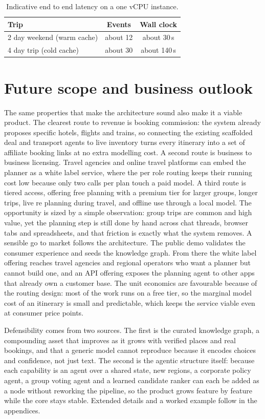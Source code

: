\documentclass{ecai}
\begin{document}
\begin{table}[h]
\caption{Indicative end to end latency on a one vCPU instance.}
\label{tab:lat}
\centering
\begin{tabular}{lcc}
\toprule
Trip & Events & Wall clock \\
\midrule
2 day weekend (warm cache) & about 12 & about 30\,s \\
4 day trip (cold cache) & about 30 & about 140\,s \\
\bottomrule
\end{tabular}
\end{table}

\section{Future scope and business outlook}
\label{sec:future}

The same properties that make the architecture sound also make it a viable
product. The clearest route to revenue is booking commission: the system
already proposes specific hotels, flights and trains, so connecting the
existing scaffolded deal and transport agents to live inventory turns every
itinerary into a set of affiliate booking links at no extra modelling cost. A
second route is business to business licensing. Travel agencies and online
travel platforms can embed the planner as a white label service, where the
per role routing keeps their running cost low because only two calls per plan
touch a paid model. A third route is tiered access, offering free planning with
a premium tier for larger groups, longer trips, live re planning during travel,
and offline use through a local model. The opportunity is sized by a simple observation: group trips are common and
high value, yet the planning step is still done by hand across chat threads,
browser tabs and spreadsheets, and that friction is exactly what the system
removes. A sensible go to market follows the architecture. The public demo
validates the consumer experience and seeds the knowledge graph. From there the
white label offering reaches travel agencies and regional operators who want a
planner but cannot build one, and an API offering exposes the planning agent to
other apps that already own a customer base. The unit economics are favourable
because of the routing design: most of the work runs on a free tier, so the
marginal model cost of an itinerary is small and predictable, which keeps the
service viable even at consumer price points.

Defensibility comes from two sources. The first is the curated knowledge graph,
a compounding asset that improves as it grows with verified places and real
bookings, and that a generic model cannot reproduce because it encodes choices
and confidence, not just text. The second is the agentic structure itself:
because each capability is an agent over a shared state, new regions, a
corporate policy agent, a group voting agent and a learned candidate ranker can
each be added as a node without reworking the pipeline, so the product grows
feature by feature while the core stays stable. Extended details and a worked
example follow in the appendices.
\end{document}
